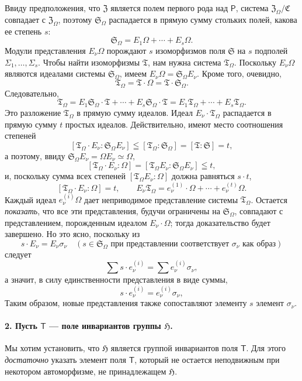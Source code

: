 \documentclass[11pt]{article}
\begin{document}
Ввиду предположения, что \(\mathfrak Z\) является полем первого рода над \(\mathsf P\), система \(\mathfrak Z_\Omega/\mathfrak C\) совпадает с \(\mathfrak Z_\Omega\), поэтому \(\mathfrak S_\Omega\) распадается в прямую сумму стольких полей, какова ее степень \(s\):
\[
\mathfrak S_\Omega = E_1\Omega+\cdots+E_s\Omega .
\]
Модули представления \(E_\nu\Omega\) порождают \(s\) изоморфизмов поля \(\mathfrak S\) на \(s\) подполей \(\Sigma_1,\ldots,\Sigma_s\). Чтобы найти изоморфизмы \(\mathfrak T\), нам нужна система \(\mathfrak T_\Omega\). Поскольку \(E_\nu\Omega\) являются идеалами системы \(\mathfrak S_\Omega\), имеем \(E_\nu\Omega=\mathfrak S_\Omega E_\nu\). Кроме того, очевидно,
\[
\mathfrak T_\Omega=\mathfrak T\cdot\Omega=\mathfrak T\cdot\mathfrak S_\Omega .
\]
Следовательно,
\[
\mathfrak T_\Omega
=E_1\mathfrak S_\Omega\cdot\mathfrak T+\cdots+E_s\mathfrak S_\Omega\cdot\mathfrak T
=E_1\mathfrak T_\Omega+\cdots+E_s\mathfrak T_\Omega .
\]
Это разложение \(\mathfrak T_\Omega\) в прямую сумму идеалов. Идеал \(E_\nu\cdot\mathfrak T_\Omega\) распадается в прямую сумму \(t\) простых идеалов. Действительно, имеют место соотношения степеней
\[
[\mathfrak T_\Omega\cdot E_\nu:\mathfrak S_\Omega E_\nu]
\leqq [\mathfrak T_\Omega:\mathfrak S_\Omega]=[\mathfrak T:\mathfrak S]=t,
\]
а поэтому, ввиду \(\mathfrak S_\Omega E_\nu=\Omega E_\nu\simeq\Omega\),
\[
[\mathfrak T_\Omega\cdot E_\nu:\Omega]
=[\mathfrak T_\Omega E_\nu:\mathfrak S_\Omega E_\nu]\leqq t,
\]
и, поскольку сумма всех степеней \([\mathfrak T_\Omega E_\nu:\Omega]\) должна равняться \(s\cdot t\),
\[
[\mathfrak T_\Omega\cdot E_\nu:\Omega]=t,\qquad
E_\nu\mathfrak T_\Omega=e_\nu^{(1)}\cdot\Omega+\cdots+e_\nu^{(t)}\Omega .
\]
Каждый идеал \(e_\nu^{(i)}\Omega\) дает неприводимое представление системы \(\mathfrak T_\Omega\). Остается \emph{показать}, что все эти представления, будучи ограничены на \(\mathfrak S_\Omega\), совпадают с представлением, порожденным идеалом \(E_\nu\cdot\Omega\); тогда доказательство будет завершено. Но это ясно, поскольку из
\[
s\cdot E_\nu=E_\nu\sigma_\nu\quad
(s\in\mathfrak S_\Omega\text{ при представлении соответствует }\sigma_\nu\text{ как образ})
\]
следует
\[
\sum s\cdot e_\nu^{(i)}=\sum e_\nu^{(i)}\sigma_\nu,
\]
а значит, в силу единственности представления в виде суммы,
\[
s\cdot e_\nu^{(i)}=e_\nu^{(i)}\sigma_\nu,
\]
Таким образом, новые представления также сопоставляют элементу \(s\) элемент \(\sigma_\nu\).

\paragraph{2. Пусть \(\mathsf T\) --- поле инвариантов группы \(\mathfrak H\).}
Мы хотим установить, что \(\mathfrak H\) является группой инвариантов поля \(\mathsf T\). Для этого \emph{достаточно} указать элемент поля \(\mathsf T\), который не остается неподвижным при некотором автоморфизме, не принадлежащем \(\mathfrak H\).
\end{document}

